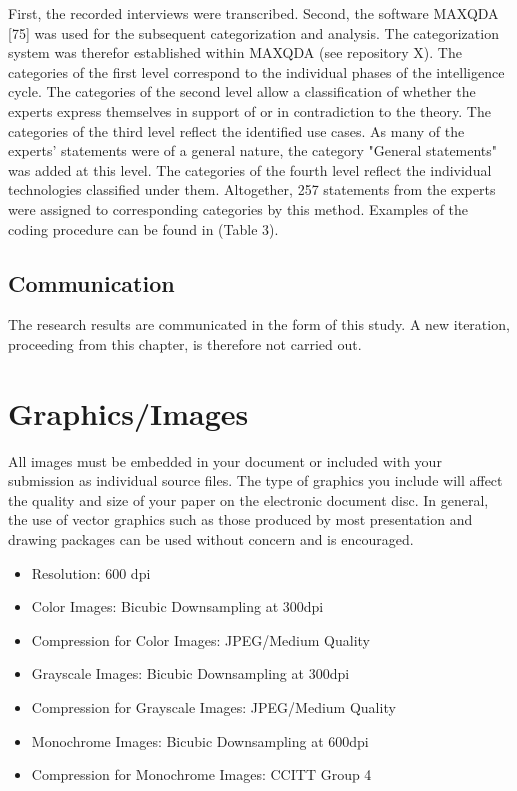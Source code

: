 \documentclass[10pt]{article}
\begin{document}
First, the recorded interviews were transcribed. Second, the software
MAXQDA [75] was used for the subsequent categorization and analysis.
The categorization system was therefor established within MAXQDA
(see repository X). The categories of the first level correspond to
the individual phases of the intelligence cycle. The categories of the
second level allow a classification of whether the experts express
themselves in support of or in contradiction to the theory. The
categories of the third level reflect the identified use cases.
As many of the experts' statements were of a general nature, the
category "General statements" was added at this level. The categories
of the fourth level reflect the individual technologies classified
under them. Altogether, 257 statements from the experts were assigned
to corresponding categories by this method. Examples of the coding
procedure can be found in (Table 3).

\subsection{Communication}

The research results are communicated in the form of this study.
A new iteration, proceeding from this chapter, is therefore not
carried out.

\section{Graphics/Images}

All images must be embedded in your document or included with your submission as individual source files. The type of graphics you include will affect the quality and size of your paper on the electronic document disc. In general, the use of vector graphics such as those produced by most presentation and drawing packages can be used without concern and is encouraged.

\begin{itemize}
    \item Resolution: 600 dpi
    \item Color Images: Bicubic Downsampling at 300dpi
    \item Compression for Color Images: JPEG/Medium Quality
    \item Grayscale Images: Bicubic Downsampling at 300dpi
    \item Compression for Grayscale Images: JPEG/Medium Quality
    \item Monochrome Images: Bicubic Downsampling at 600dpi
    \item Compression for Monochrome Images: CCITT Group 4
\end{itemize}
\end{document}
